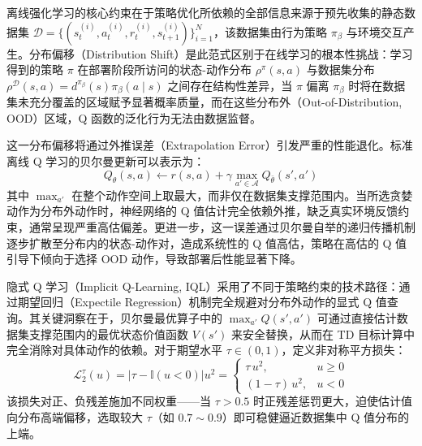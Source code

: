 离线强化学习的核心约束在于策略优化所依赖的全部信息来源于预先收集的静态数据集 $\mathcal{D} = \{ ( s_t^{(i)}, a_t^{(i)}, r_t^{(i)}, s_{t+1}^{(i)} ) \}_{i=1}^{N}$，该数据集由行为策略 $\pi_\beta$ 与环境交互产生。分布偏移（Distribution Shift）是此范式区别于在线学习的根本性挑战：学习得到的策略 $\pi$ 在部署阶段所访问的状态-动作分布 $\rho^\pi(s, a)$ 与数据集分布 $\rho^{\mathcal{D}}(s, a) = d^{\pi_\beta}(s)\pi_\beta(a \mid s)$ 之间存在结构性差异，当 $\pi$ 偏离 $\pi_\beta$ 时将在数据集未充分覆盖的区域赋予显著概率质量，而在这些分布外（Out-of-Distribution, OOD）区域，Q 函数的泛化行为无法由数据监督。

这一分布偏移将通过外推误差（Extrapolation Error）引发严重的性能退化。标准离线 Q 学习的贝尔曼更新可以表示为：
\begin{equation}
    Q_{\theta}(s, a) \leftarrow r(s, a) + \gamma \max_{a' \in \mathcal{A}} Q_{\bar{\theta}}(s', a')
\end{equation}
其中 $\max_{a'}$ 在整个动作空间上取最大，而非仅在数据集支撑范围内。当所选贪婪动作为分布外动作时，神经网络的 Q 值估计完全依赖外推，缺乏真实环境反馈约束，通常呈现严重高估偏差。更进一步，这一误差通过贝尔曼自举的递归传播机制逐步扩散至分布内的状态-动作对，造成系统性的 Q 值高估，策略在高估的 Q 值引导下倾向于选择 OOD 动作，导致部署后性能显著下降。


隐式 Q 学习（Implicit Q-Learning, IQL）\cite{kostrikov2021offline}采用了不同于策略约束的技术路径：通过期望回归（Expectile Regression）机制完全规避对分布外动作的显式 Q 值查询。其关键洞察在于，贝尔曼最优算子中的 $\max_{a'} Q(s', a')$ 可通过直接估计数据集支撑范围内的最优状态价值函数 $V(s')$ 来安全替换，从而在 TD 目标计算中完全消除对具体动作的依赖。对于期望水平 $\tau \in (0, 1)$，定义非对称平方损失：
\begin{equation}
    \mathcal{L}_2^\tau(u) = \left| \tau - \mathbb{I}(u < 0) \right| u^2 = \begin{cases} \tau \, u^2, & u \geq 0 \\ (1 - \tau)\, u^2, & u < 0 \end{cases}
\end{equation}
该损失对正、负残差施加不同权重——当 $\tau > 0.5$ 时正残差惩罚更大，迫使估计值向分布高端偏移，选取较大 $\tau$（如 $0.7 \sim 0.9$）即可稳健逼近数据集中 Q 值分布的上端。

